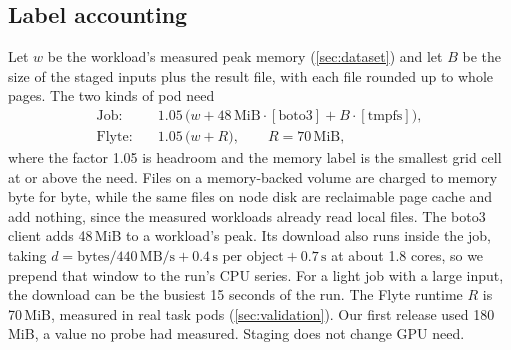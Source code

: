 \begin{table}[tbp]
\centering\small
\caption{The four Job stagings.}
\label{tab:stagings}
\end{table}

\subsection{Label accounting}
\label{sec:accounting}
Let $w$ be the workload's measured peak memory (\cref{sec:dataset}) and let $B$ be the
size of the staged inputs plus the result file, with each file rounded up to whole pages.
The two kinds of pod need
\begin{align*}
\text{Job:}\quad & 1.05\,\bigl(w + 48\,\text{MiB}\cdot[\text{boto3}] + B\cdot[\text{tmpfs}]\bigr),\\
\text{Flyte:}\quad & 1.05\,\bigl(w + R\bigr), \qquad R = 70\,\text{MiB},
\end{align*}
where the factor 1.05 is headroom and the memory label is the smallest grid cell at or
above the need. Files on a memory-backed volume are
charged to memory byte for byte, while the same files on node disk are reclaimable page
cache and add nothing, since the measured workloads already read local files. The boto3
client adds 48\,MiB to a workload's peak. Its download also runs inside the job, taking
$d = \text{bytes}/440\,\text{MB/s} + 0.4\,\text{s per object} + 0.7\,\text{s}$ at about
1.8 cores, so we prepend that window to the run's CPU series. For a light job with a large
input, the download can be the busiest 15 seconds of the run. The Flyte runtime $R$ is
70\,MiB, measured in real task pods (\cref{sec:validation}). Our first release used
180\,MiB, a value no probe had measured. Staging does not change GPU need.

